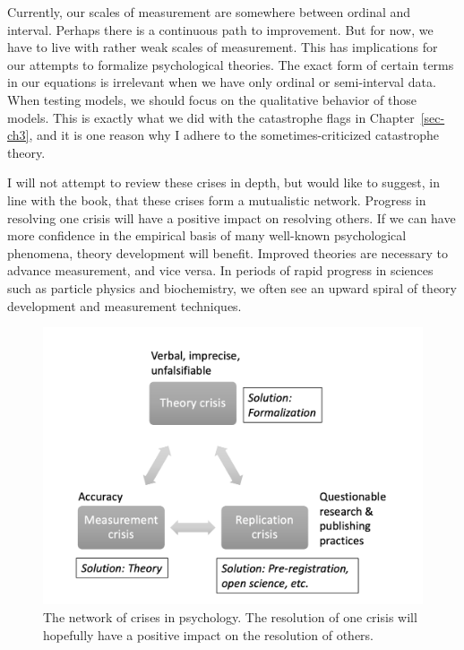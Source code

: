 \documentclass[
  a4paper,
  DIV=11,
  numbers=noendperiod,
  oneside]{scrreprt}
\begin{document}
Currently, our scales of measurement are somewhere between ordinal and
interval. Perhaps there is a continuous path to improvement. But for
now, we have to live with rather weak scales of measurement. This has
implications for our attempts to formalize psychological theories. The
exact form of certain terms in our equations is irrelevant when we have
only ordinal or semi-interval data. When testing models, we should focus
on the qualitative behavior of those models. This is exactly what we did
with the catastrophe flags in Chapter~\ref{sec-ch3}, and it is one
reason why I adhere to the sometimes-criticized catastrophe theory.

I will not attempt to review these crises in depth, but would like to
suggest, in line with the book, that these crises form a mutualistic
network. Progress in resolving one crisis will have a positive impact on
resolving others. If we can have more confidence in the empirical basis
of many well-known psychological phenomena, theory development will
benefit. Improved theories are necessary to advance measurement, and
vice versa. In periods of rapid progress in sciences such as particle
physics and biochemistry, we often see an upward spiral of theory
development and measurement techniques.

\begin{figure}

{\centering \includegraphics{media/ch8/ch8-fig1-extra.png}

}

\caption{The network of crises in psychology. The resolution of one
crisis will hopefully have a positive impact on the resolution of
others.}

\end{figure}
\end{document}
